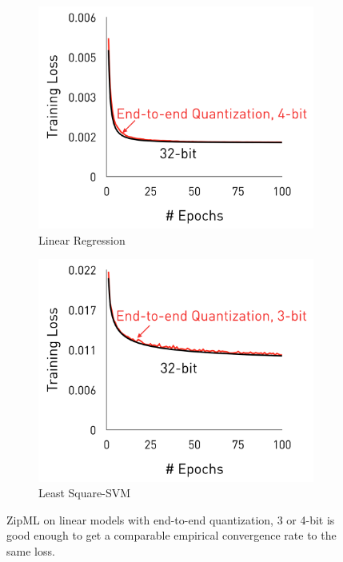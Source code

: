 \documentclass{article}
\begin{document}
\begin{figure}[h]
\centering
    \begin{subfigure}[h]{.4\columnwidth}
    \includegraphics[width=\columnwidth]{final-experiments/LinearRegression} 
    \caption{Linear Regression}
    \end{subfigure}
    \begin{subfigure}[h]{.4\columnwidth}
    \includegraphics[width=\columnwidth]{final-experiments/LSSVM} 
    \caption{Least Square-SVM}
    \end{subfigure}
\caption{ZipML on linear models with end-to-end quantization, 3 or 4-bit is good enough to get a comparable empirical convergence rate to the same loss.}
\label{fig:convergence}
\end{figure}
\end{document}
